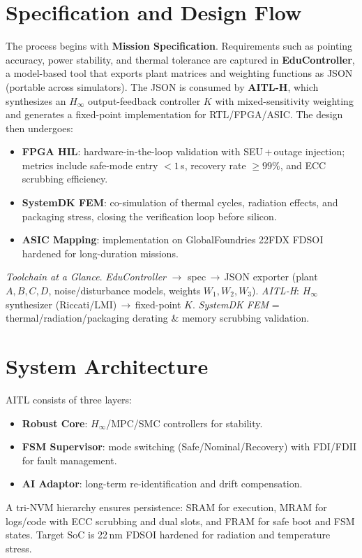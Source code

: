 \documentclass[conference]{IEEEtran}
\begin{document}
\section{Specification and Design Flow}
The process begins with \textbf{Mission Specification}. Requirements such as pointing accuracy, power stability, and thermal tolerance are captured in \textbf{EduController}, a model-based tool that exports plant matrices and weighting functions as JSON (portable across simulators). The JSON is consumed by \textbf{AITL-H}, which synthesizes an $H_\infty$ output-feedback controller $K$ with mixed-sensitivity weighting and generates a fixed-point implementation for RTL/FPGA/ASIC. The design then undergoes:
\begin{itemize}[itemsep=0pt,topsep=1pt,leftmargin=*]
  \item \textbf{FPGA HIL}: hardware-in-the-loop validation with SEU\,+\,outage injection; metrics include safe-mode entry $<\!1$\,s, recovery rate $\ge 99\%$, and ECC scrubbing efficiency.
  \item \textbf{SystemDK FEM}: co-simulation of thermal cycles, radiation effects, and packaging stress, closing the verification loop before silicon.
  \item \textbf{ASIC Mapping}: implementation on GlobalFoundries 22FDX FDSOI hardened for long-duration missions.
\end{itemize}
\textit{Toolchain at a Glance}. \emph{EduController} $\rightarrow$ spec\,$\rightarrow$\,JSON exporter (plant $A,B,C,D$, noise/disturbance models, weights $W_1,W_2,W_3$). \emph{AITL-H}: $H_\infty$ synthesizer (Riccati/LMI)\,$\rightarrow$\,fixed-point $K$. \emph{SystemDK FEM} = thermal/radiation/packaging derating \& memory scrubbing validation.

\section{System Architecture}
AITL consists of three layers:
\begin{itemize}[itemsep=0pt,topsep=1pt,leftmargin=*]
  \item \textbf{Robust Core}: $H_\infty$/MPC/SMC controllers for stability.
  \item \textbf{FSM Supervisor}: mode switching (Safe/Nominal/Recovery) with FDI/FDI\!I for fault management.
  \item \textbf{AI Adaptor}: long-term re-identification and drift compensation.
\end{itemize}
A tri-NVM hierarchy ensures persistence: SRAM for execution, MRAM for logs/code with ECC scrubbing and dual slots, and FRAM for safe boot and FSM states. Target SoC is 22\,nm FDSOI hardened for radiation and temperature stress.
\end{document}
